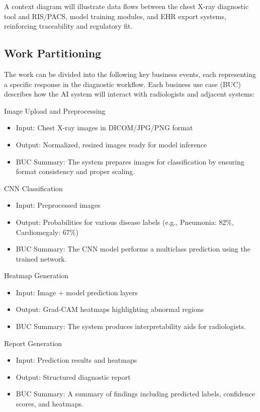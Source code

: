 \documentclass[12pt]{article}
\begin{document}
A context diagram will illustrate data flows between the chest X-ray diagnostic tool and RIS/PACS, model training modules, and EHR export systems, reinforcing traceability and regulatory fit.

\subsection{Work Partitioning}
The work can be divided into the following key business events, each representing a specific response in the diagnostic workflow. Each business use case (BUC) describes how the AI system will interact with radiologists and adjacent systems:

Image Upload and Preprocessing
\begin{itemize}
    \item Input: Chest X-ray images in DICOM\cite{dicom}/JPG/PNG format
    \item Output: Normalized, resized images ready for model inference
    \item BUC Summary: The system prepares images for classification by ensuring format consistency and proper scaling.
\end{itemize}

CNN Classification
\begin{itemize}
    \item Input: Preprocessed images
    \item Output: Probabilities for various disease labels (e.g., Pneumonia: 82\%, Cardiomegaly: 67\%)
    \item BUC Summary: The CNN model performs a multiclass prediction using the trained network.
\end{itemize}

Heatmap Generation
\begin{itemize}
    \item Input: Image + model prediction layers
    \item Output: Grad-CAM heatmaps highlighting abnormal regions
    \item BUC Summary: The system produces interpretability aids for radiologists.
\end{itemize}

Report Generation
\begin{itemize}
    \item Input: Prediction results and heatmaps
    \item Output: Structured diagnostic report
    \item BUC Summary: A summary of findings including predicted labels, confidence scores, and heatmaps.
\end{itemize}
\end{document}
